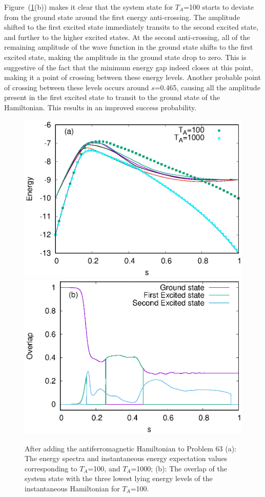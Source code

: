 \documentclass[../main.tex]{subfiles}
\begin{document}
Figure~(\ref{fig:a54}(b)) makes it clear that the system state for $T_A$=100 starts to deviate from the ground state around the first energy anti-crossing. The amplitude shifted to the first excited state immediately transits to the second excited state, and further to the higher excited states. At the second anti-crossing, all of the remaining amplitude of the wave function in the ground state shifts to the first excited state, making the amplitude in the ground state drop to zero. This is suggestive of the fact that the minimum energy gap indeed closes at this point, making it a point of crossing between these energy levels. Another probable point of crossing between these levels occurs around $s$=0.465, causing all the amplitude present in the first excited state to transit to the ground state of the Hamiltonian. This results in an improved success probability.
\begin{figure}
\centering
  \includegraphics[scale=0.8 ]{63_A_g2.eps}  
\includegraphics[scale=0.8 ]{63_A_g2_Overlap.eps}
  \caption{After adding the antiferromagnetic Hamiltonian to Problem 63 (a): The energy spectra and instantaneous energy expectation values corresponding to $T_A$=100, and $T_A$=1000; (b): The overlap of the system state with the three lowest lying energy levels of the instantaneous Hamiltonian for $T_A$=100.}
    \label{fig:a54}
 \end{figure}
\end{document}
